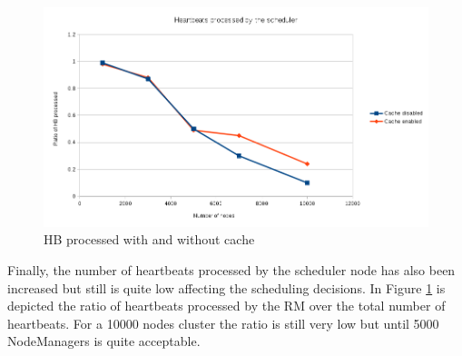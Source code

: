 \begin{figure}
\centering
\includegraphics[scale=0.6]{resources/images/Evaluation/dto_cache_hb_processed.png}
\caption{HB processed with and without cache}
\label{fig:ev_cache_hb_processed}
\end{figure}

Finally, the number of heartbeats processed by the scheduler node has
also been increased but  still is quite low
affecting the scheduling decisions. In Figure
\ref{fig:ev_cache_hb_processed} is depicted the ratio of
heartbeats processed by the RM over the total number of
heartbeats. For a 10000 nodes cluster the ratio is still very low but
until 5000 NodeManagers is quite acceptable.